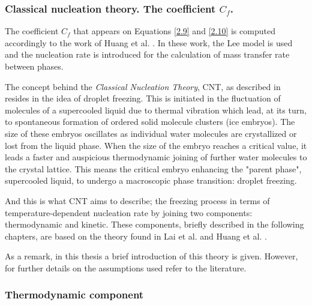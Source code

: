 \subsubsection{Classical nucleation theory. The coefficient $C_f$.}

\setlength{\parindent}{0.5cm} The coefficient $C_f$ that appears on Equations \ref{2.9} and \ref{2.10} is computed accordingly to the work of Huang et al. \cite{huang_wang_li_2020}. In these work, the Lee model is used and the nucleation rate is introduced for the calculation of mass transfer rate between phases. 

\noindent The concept behind the \textit{Classical Nucleation Theory}, CNT, as described in \cite{ickes_welti_hoose_lohmann_2015} resides in the idea of droplet freezing. This is initiated in the fluctuation of molecules of a supercooled liquid due to thermal vibration which lead, at its turn, to spontaneous formation of ordered solid molecule clusters (ice embryos). The size of these embryos oscillates as individual water molecules are crystallized or lost from the liquid phase. When the size of the embryo reaches a critical value, it leads a faster and auspicious thermodynamic joining of further water molecules to the crystal lattice. This means the critical embryo enhancing the "parent phase", supercooled liquid, to undergo a macroscopic phase transition: droplet freezing.

\noindent And this is what CNT aims to describe; the freezing process in terms of temperature-dependent nucleation rate by joining two components: thermodynamic and kinetic. These components, briefly described in the following chapters, are based on the theory found in Lai et al. \cite{wu_lai_zhang_2015} and Huang et al. \cite{huang_wang_li_2020}.

\noindent As a remark, in this thesis a brief introduction of this theory is given. However, for further details on the assumptions used refer to the literature.

\subsubsection*{Thermodynamic component}

